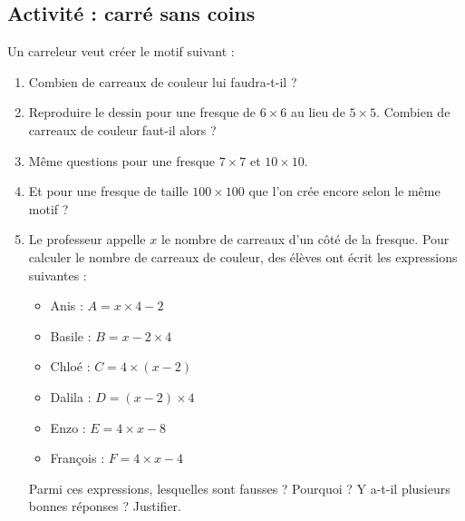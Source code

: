 
\subsection*{Activité : carré sans coins}

Un carreleur veut créer le motif suivant :
\begin{center}
   
\end{center}
\begin{enumerate}
    \item
Combien de carreaux de couleur lui faudra-t-il ? 
\item
Reproduire le dessin pour une fresque de \( 6\times 6\) au lieu de \( 5\times 5\). Combien de carreaux de couleur faut-il alors ? 
\item
    Même questions pour une fresque \( 7\times 7\) et \( 10\times 10\).
\item
Et pour une fresque de taille \( 100\times 100\) que l'on crée encore selon le même motif ?
\item
Le professeur appelle $x$ le nombre de carreaux d'un côté de la fresque. Pour calculer le nombre de carreaux de couleur, des élèves ont écrit les expressions suivantes :
\begin{multicols}{3}
    \begin{itemize}
        \item
            Anis : \( A=x\times 4-2\)
        \item
            Basile : \( B=x-2\times 4\)
        \item
            Chloé : \( C=4\times (x-2)\)
        \item
             Dalila : \( D=(x-2)\times 4 \)
         \item
             Enzo : \( E=4\times x-8\)
         \item
             François : \( F=4\times x-4\)
    \end{itemize}
\end{multicols}
Parmi ces expressions, lesquelles sont fausses ? Pourquoi ? Y a-t-il plusieurs bonnes réponses ? Justifier.
\end{enumerate}


